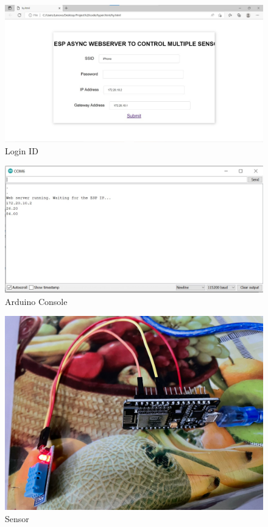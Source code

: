 \documentclass[12pt,a4paper,twocolumn,fleqn]{article}
\begin{document}
\begin{figure} [H]
\includegraphics[width=15cm]{media/LoginID.jpeg}
\centering
\caption{Login ID}
\end{figure}
\begin{figure} [H]
\includegraphics[width=15cm]{media/Sensor1.jpeg}
\centering
\caption{ Arduino Console }
\end{figure}
\begin{figure} [H]
\includegraphics[width=15cm]{media/SensorWeb1.jpeg}
\centering
\caption{Sensor}
\end{figure}
\end{document}
